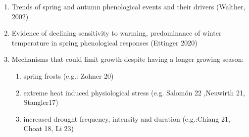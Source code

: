 \documentclass{article}
\begin{document}
\begin{enumerate}
	\item  Trends of spring and autumn phenological events and their drivers (Walther, 2002)
	\item Evidence of declining sensitivity to warming, predominance of winter temperature in spring phenological responses (Ettinger 2020)
	\item Mechanisms that could limit growth despite having a longer growing season:
		\begin{enumerate} 
			\item spring frosts (e.g.: Zohner 20)
			\item extreme heat induced physiological stress (e.g. Salomón 22 ,Neuwirth 21, Stangler17)
			\item increased drought frequency, intensity and duration (e.g.:Chiang 21, Choat 18, Li 23)
		\end{enumerate}


\end{enumerate}
\end{document}
